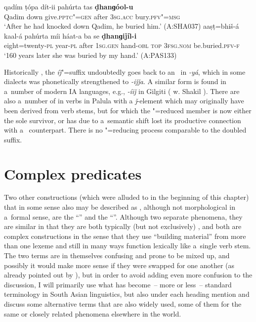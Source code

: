 \begin{exe}
\ea
\label{ex:8-17}
\gll qadím ṭópa dít-ii pahúrta tas \textbf{ḍhanɡóol-u} \\
Qadim down give.\textsc{pptc"=gen} after \textsc{3sg.acc} bury.\textsc{pfv"=msg}\\
\glt `After he had knocked down Qadim, he buried him.' (A:SHA037) 
\ex
\label{ex:8-18}
\gll aaṣṭ=bhiš-á kaal-á pahúrta míi háat-a ba se  \textbf{ḍhanɡiǰíl-i}\\
eight=twenty-\textsc{pl} year-\textsc{pl} after \textsc{1sg.gen} hand-\textsc{obl} \textsc{top} \textsc{3fsg.nom} be.buried.\textsc{pfv-f}\\
\glt `160 years later she was buried by my hand.' (A:PAS133)
\z


Historically \citep[316--317]{masica1991}, the \textit{íǰ}"=suffix undoubtedly goes back to an~\iliOIA {} in \textit{-yá}, which in some \iliMIA dialects was phonetically strengthened to \textit{-iǰǰa}. A similar form is found in a~number of modern IA languages, e.g., \textit{-íiǰ} in Gilgiti \iliShina (\citeauthor{radloffshakil1998} w. Shakil \citeyear[116]{radloffshakil1998}). There are also a~number of in verbs in Palula with a \textit{ǰ}-element which may originally have been derived from  verb stems, but for which the "=reduced member is now either the sole survivor, or has due to a~semantic shift lost its productive connection with a~ counterpart. There is no "=reducing process comparable to the doubled  suffix.


\section{Complex predicates}
\label{sec:8-6}


Two other constructions (which were alluded to in the beginning of this chapter) that in some sense also may be described as , although not morphological in a~formal sense, are the ``'' and the ``''. Although two separate phenomena, they are similar in that they are both typically (but not exclusively) \iliIndoAryan, and both are complex constructions in the sense that they use ``building material'' from more than one lexeme and still in many ways function lexically like a~single verb stem. The two terms are in themselves confusing and prone to be mixed up, and possibly it would make more sense if they were swapped for one another (as already pointed out by \citealt[326]{masica1991}), but in order to avoid adding even more confusion to the discussion, I will primarily use what has become~-- more or less~-- standard terminology in South Asian linguistics, but also under each heading mention and discuss some alternative terms that are also widely used, some of them for the same or closely related phenomena elsewhere in the world.



\end{exe}
